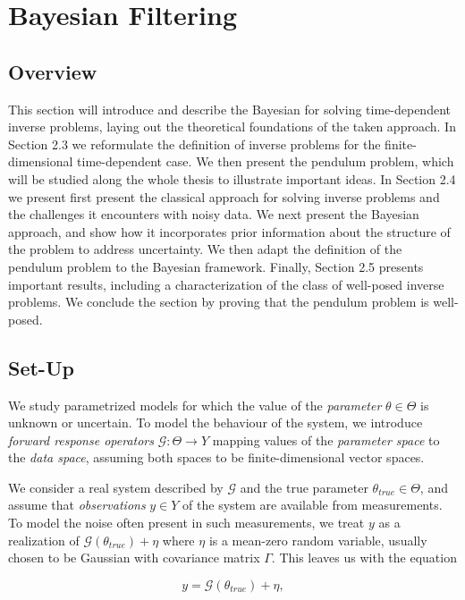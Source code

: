 \section{Bayesian Filtering}
\subsection{Overview}

This section will introduce and describe the Bayesian for solving time-dependent inverse problems, laying out the theoretical foundations of the taken approach. In Section 2.3 we reformulate the definition of inverse problems for the finite-dimensional time-dependent case. We then present the pendulum problem, which will be studied along the whole thesis to illustrate important ideas. In Section 2.4 we present first present the classical approach for solving inverse problems and the challenges it encounters with noisy data. We next present the Bayesian approach, and show how it incorporates prior information about the structure of the problem to address uncertainty. We then adapt the definition of the pendulum problem to the Bayesian framework. Finally, Section 2.5 presents important results, including a characterization of the class of well-posed inverse problems. We conclude the section by proving that the pendulum problem is well-posed.

\subsection{Set-Up}

We study parametrized models for which the value of the \textit{parameter} $\theta \in \Theta$ is unknown or uncertain. To model the behaviour of the system, we introduce \textit{forward response operators} $\mathcal{G} : \Theta \rightarrow Y$ mapping values of the \textit{parameter space} to the \textit{data space}, assuming both spaces to be finite-dimensional vector spaces.

We consider a real system described by $\mathcal{G}$ and the true parameter $\theta_{true} \in \Theta$, and assume that \textit{observations} $y \in Y$ of the system are available from measurements. To model the noise often present in such measurements, we treat $y$ as a realization of $\mathcal{G}(\theta_{true}) + \eta$ where $\eta$ is a mean-zero random variable, usually chosen to be Gaussian with covariance matrix $\Gamma$. This leaves us with the equation

\begin{equation}\label{inverse-formula}
  y = \mathcal{G}(\theta_{true}) + \eta,
\end{equation}

